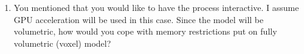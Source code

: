 \begin{enumerate}
	\item You mentioned that you would like to have the process interactive. I assume GPU acceleration will be used in this case. Since the model will be volumetric, how would you cope with memory restrictions put on fully volumetric (voxel) model?
	
\end{enumerate}
